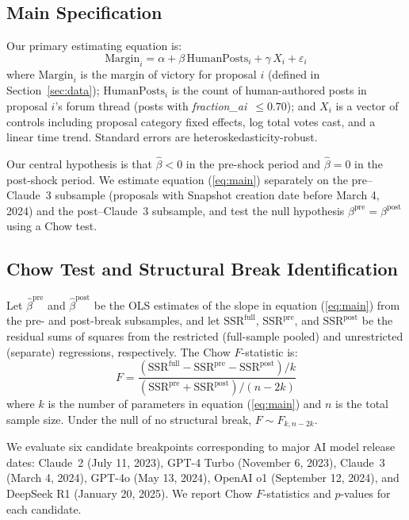 \documentclass[12pt]{article}
\begin{document}
\subsection{Main Specification}

Our primary estimating equation is:
\begin{equation}
  \text{Margin}_i = \alpha + \beta \, \text{HumanPosts}_i + \gamma \, X_i + \varepsilon_i
  \label{eq:main}
\end{equation}
where $\text{Margin}_i$ is the margin of victory for proposal $i$ (defined in
Section~\ref{sec:data}); $\text{HumanPosts}_i$ is the count of human-authored
posts in proposal $i$'s forum thread (posts with \textit{fraction\_ai}~$\leq 0.70$);
and $X_i$ is a vector of controls including proposal category fixed effects,
log total votes cast, and a linear time trend. Standard errors are heteroskedasticity-robust.

Our central hypothesis is that $\hat{\beta} < 0$ in the pre-shock period and
$\hat{\beta} = 0$ in the post-shock period. We estimate equation
(\ref{eq:main}) separately on the pre--Claude~3 subsample (proposals with Snapshot
creation date before March 4, 2024) and the post--Claude~3 subsample, and test the
null hypothesis $\beta^{\text{pre}} = \beta^{\text{post}}$ using a Chow
\citeyearpar{chow1960} test.

\subsection{Chow Test and Structural Break Identification}

Let $\hat{\beta}^{\text{pre}}$ and $\hat{\beta}^{\text{post}}$ be the OLS estimates
of the slope in equation (\ref{eq:main}) from the pre- and post-break subsamples,
and let $\text{SSR}^{\text{full}}$, $\text{SSR}^{\text{pre}}$, and
$\text{SSR}^{\text{post}}$ be the residual sums of squares from the restricted
(full-sample pooled) and unrestricted (separate) regressions, respectively. The
Chow $F$-statistic is:
\[
  F = \frac{(\text{SSR}^{\text{full}} - \text{SSR}^{\text{pre}} - \text{SSR}^{\text{post}}) / k}
           {(\text{SSR}^{\text{pre}} + \text{SSR}^{\text{post}}) / (n - 2k)}
\]
where $k$ is the number of parameters in equation (\ref{eq:main}) and $n$ is the
total sample size. Under the null of no structural break, $F \sim F_{k, n-2k}$.

We evaluate six candidate breakpoints corresponding to major AI model release dates:
Claude~2 (July 11, 2023), GPT-4 Turbo (November 6, 2023), Claude~3 (March 4, 2024),
GPT-4o (May 13, 2024), OpenAI o1 (September 12, 2024), and DeepSeek R1
(January 20, 2025). We report Chow $F$-statistics and $p$-values for each
candidate.
\end{document}
